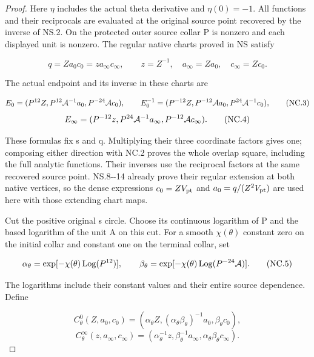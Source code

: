 \begin{proof}
Here \(\eta\) includes the actual theta derivative and \(\eta(0)=-1\). All
functions and their reciprocals are evaluated at the original source
point recovered by the inverse of NS.2. On the protected outer source
collar P is nonzero and each displayed unit is nonzero. The regular
native charts proved in NS satisfy

\[
 q=Za_0c_0=z a_\infty c_\infty,\qquad
 z=Z^{-1},\quad a_\infty=Za_0,\quad c_\infty=Zc_0.
                                                        \tag{NC.2}
\]

The actual endpoint and its inverse in these charts are

\[
 E_0=(P^{12}Z,P^{12}{\cal A}^{-1}a_0,
                         P^{-24}{\cal A}c_0),\qquad
 E_0^{-1}=(P^{-12}Z,P^{-12}{\cal A}a_0,
                         P^{24}{\cal A}^{-1}c_0),       \tag{NC.3}
\]
\[
 E_\infty=(P^{-12}z,P^{24}{\cal A}^{-1}a_\infty,
                            P^{-12}{\cal A}c_\infty).
                                                        \tag{NC.4}
\]

These formulas fix s and q. Multiplying their three coordinate
factors gives one; composing either direction with NC.2 proves the
whole overlap square, including the full analytic functions. Their
inverses use the reciprocal factors at the same recovered source
point. NS.8-\/-14 already prove their regular extension at both native
vertices, so the dense expressions \(c_{0}=Z V_{\rm pt}\) and \(a_{0}=q/(Z^{2} V_{\rm pt})\) are
used here with those extending chart maps.

Cut the positive original s circle. Choose its continuous logarithm
of P and the based logarithm of the unit A on this cut. For a smooth
\(\chi(\theta)\) constant zero on the initial collar and constant one on
the terminal collar, set

\[
 \alpha_\theta=\exp[-\chi(\theta)\operatorname{Log}(P^{12})],
 \qquad
 \beta_\theta=\exp[-\chi(\theta)
                          \operatorname{Log}(P^{-24}{\cal A})].
                                                        \tag{NC.5}
\]

The logarithms include their constant values and their entire source
dependence. Define

\[
 C_\theta^0(Z,a_0,c_0)=
 (\alpha_\theta Z,(\alpha_\theta\beta_\theta)^{-1}a_0,
                                             \beta_\theta c_0),
                                                        \tag{NC.6}
\]
\[
 C_\theta^\infty(z,a_\infty,c_\infty)=
 (\alpha_\theta^{-1}z,\beta_\theta^{-1}a_\infty,
                              \alpha_\theta\beta_\theta c_\infty).
                                                        \tag{NC.7}
\]


\end{proof}
